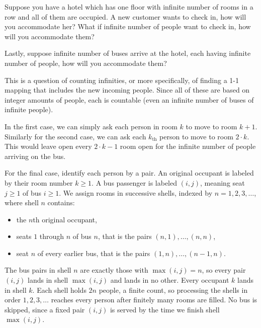 \newpage

\begin{problem}
\vspace{-1ex}
Suppose you have a hotel which has one floor with infinite number of rooms in a row and all of them are occupied. A new customer wants to check in, how will you accommodate her? What if infinite number of people want to check in, how will you accommodate them? 

Lastly, suppose infinite number of buses arrive at the hotel, each having infinite number of people, how will you accommodate them?

\end{problem}

\begin{solution}
This is a question of counting infinities, or more specifically, of finding a 1-1 mapping that includes the new incoming people. Since all of these are based on integer amounts of people, each is countable (even an infinite number of buses of infinite people).

In the first case, we can simply ask each person in room $k$ to move to room $k+1$. Similarly for the second case, we can ask each $k_{\text{th}}$ person to move to room $2 \cdot k$. This would leave open every $2 \cdot k - 1$ room open for the infinite number of people arriving on the bus.

For the final case, identify each person by a pair. An original occupant is
labeled by their room number $k \ge 1$. A bus passenger is labeled $(i, j)$,
meaning seat $j \ge 1$ of bus $i \ge 1$. We assign rooms in successive shells,
indexed by $n = 1, 2, 3, \dots$, where shell $n$ contains:
\begin{itemize}
  \item the $n$th original occupant,
  \item seats $1$ through $n$ of bus $n$, that is the pairs $(n, 1), \dots, (n, n)$,
  \item seat $n$ of every earlier bus, that is the pairs $(1, n), \dots, (n-1, n)$.
\end{itemize}

The bus pairs in shell $n$ are exactly those with $\max(i, j) = n$, so every pair
$(i, j)$ lands in shell $\max(i, j)$ and lands in no other. Every occupant $k$
lands in shell $k$. Each shell holds $2n$ people, a finite count, so processing
the shells in order $1, 2, 3, \dots$ reaches every person after finitely many
rooms are filled. No bus is skipped, since a fixed pair $(i, j)$ is served by the
time we finish shell $\max(i, j)$.
\end{solution}

